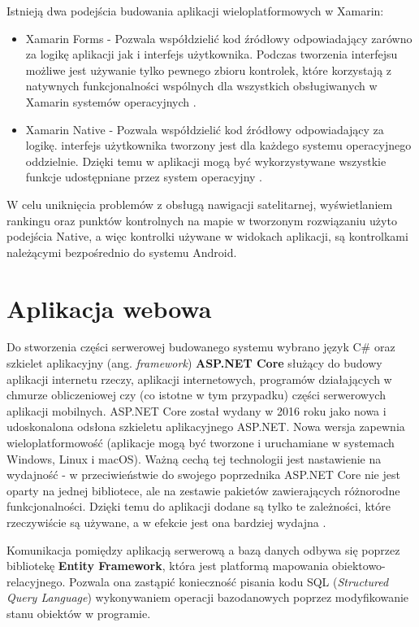 Istnieją dwa podejścia budowania aplikacji wieloplatformowych w Xamarin:
\begin {itemize}
\item{Xamarin Forms} - Pozwala współdzielić kod źródłowy odpowiadający zarówno za logikę aplikacji jak i interfejs użytkownika. Podczas tworzenia interfejsu możliwe jest używanie tylko pewnego zbioru kontrolek, które korzystają z natywnych funkcjonalności wspólnych dla wszystkich obsługiwanych w Xamarin systemów operacyjnych \cite{xamarin-forms}. 
\item{Xamarin Native} - Pozwala współdzielić kod źródłowy odpowiadający za logikę. interfejs użytkownika tworzony jest dla każdego systemu operacyjnego oddzielnie. Dzięki temu w aplikacji mogą być wykorzystywane wszystkie funkcje udostępniane przez system operacyjny \cite{xamarin-native}.
\end{itemize}
W celu uniknięcia problemów z obsługą nawigacji satelitarnej, wyświetlaniem rankingu oraz punktów kontrolnych na mapie w tworzonym rozwiązaniu użyto podejścia Native, a więc kontrolki używane w widokach aplikacji, są kontrolkami należącymi bezpośrednio do systemu Android.

\section{Aplikacja webowa}
Do stworzenia części serwerowej budowanego systemu wybrano język C\# oraz szkielet aplikacyjny (ang. \textit{framework}) \textbf{ASP.NET Core} służący do budowy aplikacji internetu rzeczy, aplikacji internetowych, programów działających w chmurze obliczeniowej czy (co istotne w tym przypadku) części serwerowych aplikacji mobilnych. ASP.NET Core został wydany w 2016 roku jako nowa i udoskonalona odsłona szkieletu aplikacyjnego ASP.NET. Nowa wersja zapewnia wieloplatformowość (aplikacje mogą być tworzone i uruchamiane w systemach Windows, Linux i macOS). Ważną cechą tej technologii jest nastawienie na wydajność - w przeciwieństwie do swojego poprzednika ASP.NET Core nie jest oparty na jednej bibliotece, ale na zestawie pakietów zawierających różnorodne funkcjonalności. Dzięki temu do aplikacji dodane są tylko te zależności, które rzeczywiście są używane, a w efekcie jest ona bardziej wydajna \cite{ksiazka-asp-core}.

Komunikacja pomiędzy aplikacją serwerową a bazą danych odbywa się poprzez bibliotekę \textbf{Entity Framework}, która jest platformą mapowania obiektowo-relacyjnego. Pozwala ona zastąpić konieczność pisania kodu SQL (\textit{Structured Query Language}) \cite{sql} wykonywaniem operacji bazodanowych poprzez modyfikowanie stanu obiektów w programie.


